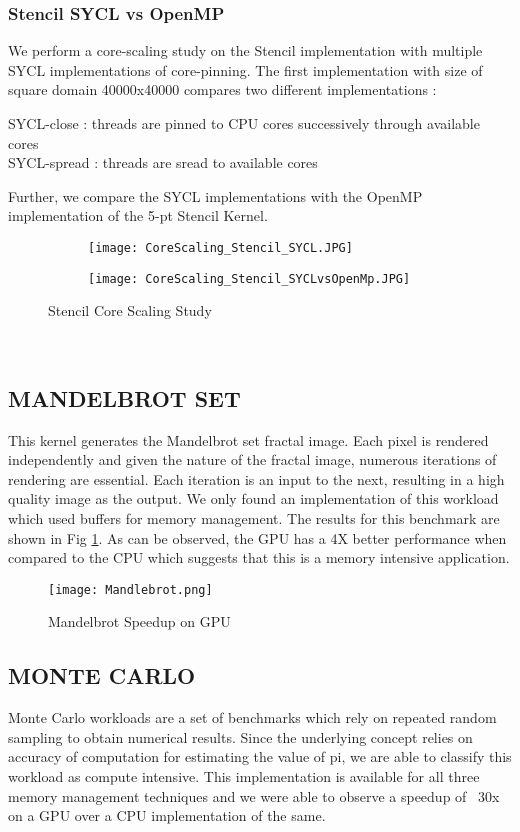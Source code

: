 \documentclass[14pt,fleqn]{article}
\begin{document}
\subsubsection{Stencil SYCL vs OpenMP}
We perform a core-scaling study on the Stencil implementation with multiple SYCL implementations of core-pinning. The first implementation with size of square domain 40000x40000 compares two different implementations :

SYCL-close : threads are pinned to CPU cores successively through available cores \\
SYCL-spread : threads are sread to available cores

Further, we compare the SYCL implementations with the OpenMP implementation of the 5-pt Stencil Kernel.

\begin{figure}
\begin{subfigure}{.5\textwidth}
    \texttt{[image: CoreScaling\_Stencil\_SYCL.JPG]}
\end{subfigure}%
\begin{subfigure}{.5\textwidth}
    \texttt{[image: CoreScaling\_Stencil\_SYCLvsOpenMp.JPG]}
\end{subfigure}%
    \caption{Stencil Core Scaling Study}
\end{figure}
\\
\subsection{MANDELBROT SET}
This kernel generates the Mandelbrot set fractal image. Each pixel is rendered independently and given the nature of the fractal image, numerous iterations of rendering are essential. Each iteration is an input to the next, resulting in a high quality image as the output. We only found an implementation of this workload which used buffers for memory management. The results for this benchmark are shown in Fig \ref{fig:Mandlebrot}. As can be observed, the GPU has a 4X better performance when compared to the CPU which suggests that this is a memory intensive application.
\begin{figure}
\centering
    \texttt{[image: Mandlebrot.png]}
    \caption{Mandelbrot Speedup on GPU}
    \label{fig:Mandlebrot}
\end{figure}
\subsection{MONTE CARLO}
Monte Carlo workloads are a set of benchmarks which rely on repeated random sampling to obtain numerical results. Since the underlying concept relies on accuracy of computation for estimating the value of pi, we are able to classify this workload as compute intensive. This implementation is available for all three memory management techniques and we were able to observe a speedup of ~30x on a GPU over a CPU implementation of the same. \\\\\\\\\
\end{document}
